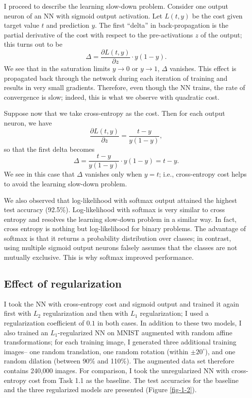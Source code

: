 \documentclass[11pt]{article}
\begin{document}
I proceed to describe the learning slow-down problem. Consider one output neuron of an NN with sigmoid output activation. Let $L(t, y)$ be the cost given target value $t$ and prediction $y$. The first ``delta'' in back-propagation is the partial derivative of the cost with respect to the pre-activations $z$ of the output; this turns out to be
\[ \Delta = \frac{\partial L(t, y)}{\partial z}\cdot y(1-y). \]
We see that in the saturation limits $y\rightarrow 0$ or $y\rightarrow 1$, $\Delta$ vanishes. This effect is propagated back through the network during each iteration of training and results in very small gradients. Therefore, even though the NN trains, the rate of convergence is slow; indeed, this is what we observe with quadratic cost.

Suppose now that we take cross-entropy as the cost. Then for each output neuron, we have
\[ \frac{\partial L(t, y)}{\partial z} = \frac{t-y}{y(1-y)}, \]
so that the first delta becomes
\[ \Delta = \frac{t-y}{y(1-y)}\cdot y(1-y) = t-y. \]
We see in this case that $\Delta$ vanishes only when $y=t$; i.e., cross-entropy cost helps to avoid the learning slow-down problem.

We also observed that log-likelihood with softmax output attained the highest test accuracy (92.5\%). Log-likelihood with softmax is very similar to cross entropy and resolves the learning slow-down problem in a similar way. In fact, cross entropy is nothing but log-likelihood for binary problems. The advantage of softmax is that it returns a probability distribution over classes; in contrast, using multiple sigmoid output neurons falsely assumes that the classes are not mutually exclusive. This is why softmax improved performance.


\subsection{Effect of regularization}

I took the NN with cross-entropy cost and sigmoid output and trained it again first with $L_2$ regularization and then with $L_1$ regularization; I used a regularization coefficient of $0.1$ in both cases. In addition to these two models, I also trained an $L_1$-regularized NN on MNIST augmented with random affine transformations; for each training image, I generated three additional training images-- one random translation, one random rotation (within $\pm 20^\circ$), and one random dilation (between 90\% and 110\%). The augmented data set therefore contains 240,000 images. For comparison, I took the unregularized NN with cross-entropy cost from Task 1.1 as the baseline. The test accuracies for the baseline and the three regularized models are presented (Figure \ref{fig-1-2}).
\end{document}
